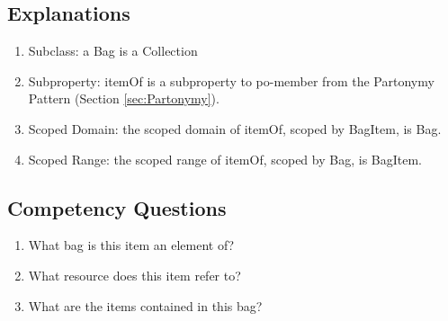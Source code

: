 \subsection{Explanations}
\label{exp:Aggregation,}
\begin{enumerate}
\item Subclass: a \textsf{Bag} is a \textsf{Collection}
\item Subproperty: \textsf{itemOf} is a subproperty to \textsf{po-member} from the Partonymy Pattern (Section \ref{sec:Partonymy}).
\item Scoped Domain: the scoped domain of \textsf{itemOf}, scoped by \textsf{BagItem}, is \textsf{Bag}.
\item Scoped Range: the scoped range of \textsf{itemOf}, scoped by \textsf{Bag}, is \textsf{BagItem}.
\end{enumerate}

\subsection{Competency Questions}
\label{cqs:Aggregation,}
\begin{enumerate}[CQ1.]
\item What bag is this item an element of?
\item What resource does this item refer to?
\item What are the items contained in this bag?
\end{enumerate}

\newpage
